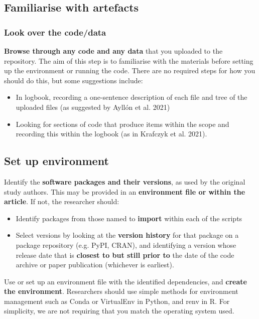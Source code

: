 \vspace{0.5cm}
\subsection{Familiarise with artefacts}

\subsubsection{Look over the code/data}

\textbf{Browse through any code and any data} that you uploaded to the repository. The aim of this step is to familiarise with the materials before setting up the environment or running the code. There are no required steps for how you should do this, but some suggestions include:
\begin{itemize}
    \item In logbook, recording a one-sentence description of each file and tree of the uploaded files (as suggested by Ayllón et al. 2021\autocite{ayllon_keeping_2021})
    \item Looking for sections of code that produce items within the scope and recording this within the logbook (as in Krafczyk et al. 2021\cite{krafczyk_learning_2021}).
\end{itemize}

\newpage
\subsection{Set up environment}

Identify the \textbf{software packages and their versions}, as used by the original study authors. This may be provided in an \textbf{environment file or within the article}. If not, the researcher should:
\begin{itemize}
    \item Identify packages from those named to \textbf{import} within each of the scripts
    \item Select versions by looking at the \textbf{version history} for that package on a package repository (e.g. PyPI, CRAN), and identifying a version whose release date that is \textbf{closest to but still prior to} the date of the code archive or paper publication (whichever is earliest).
\end{itemize}

Use or set up an environment file with the identified dependencies, and \textbf{create the environment}. Researchers should use simple methods for environment management such as Conda or VirtualEnv in Python, and renv in R. For simplicity, we are not requiring that you match the operating system used.

